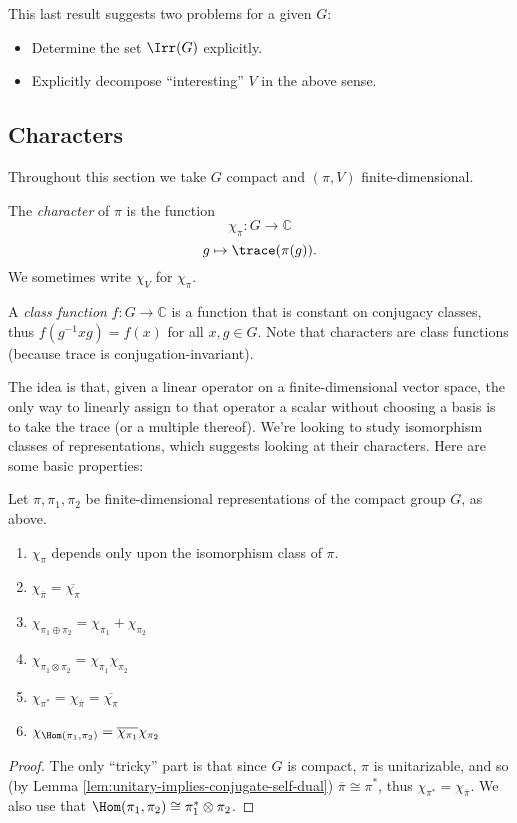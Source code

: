 \documentclass[reqno]{amsart} 
\begin{document}
This last result suggests two problems for a given $G$:
\begin{itemize}
\item Determine the set $\Irr(G)$ explicitly.
\item Explicitly decompose ``interesting'' $V$ in the above sense.
\end{itemize}

\subsection{Characters}\label{sec:cnh2vn9fzw}
Throughout this section we take $G$ compact and $(\pi,V)$ finite-dimensional.
\begin{definition}
  The \emph{character} of $\pi$ is the function
  \begin{equation*}
    \chi_\pi : G \rightarrow \mathbb{C}
  \end{equation*}
  \begin{equation*}
    g \mapsto \trace(\pi(g)).
  \end{equation*}
  We sometimes write $\chi_V$ for $\chi_\pi$.
  
  A \emph{class function} $f : G \rightarrow \mathbb{C}$ is a function that is constant on conjugacy classes, thus $f(g^{-1} x g) = f(x)$ for all $x,g \in G$.  Note that characters are class functions (because trace is conjugation-invariant).
\end{definition}
The idea is that, given a linear operator on a finite-dimensional vector space, the only way to linearly assign to that operator a scalar without choosing a basis is to take the trace (or a multiple thereof).  We're looking to study isomorphism classes of representations, which suggests looking at their characters.  Here are some basic properties:
\begin{lemma}\label{lem:characters-basic}
  Let $\pi, \pi_1, \pi_2$ be finite-dimensional representations of the compact group $G$, as above.
  \begin{enumerate}
  \item $\chi_{\pi}$ depends only upon the isomorphism class of $\pi$.
  \item $\chi_{\overline{\pi }} = \overline{\chi_\pi}$
  \item $\chi_{\pi_1 \oplus \pi_2}= \chi_{\pi_1} + \chi_{\pi_2}$
  \item $\chi_{\pi_1 \otimes \pi_2}= \chi_{\pi_1} \chi_{\pi_2}$
  \item $\chi_{\pi^*} = \chi_{\overline{\pi }} = \overline{\chi_\pi }$
  \item $\chi_{\Hom(\pi_1,\pi_2)} = \overline{\chi_{\pi_1}} \chi_{\pi_2}$
  \end{enumerate}
\end{lemma}
\begin{proof}
  The only ``tricky'' part is that since $G$ is compact, $\pi$ is unitarizable, and so (by Lemma \ref{lem:unitary-implies-conjugate-self-dual}) $\overline{\pi } \cong \pi^*$, thus $\chi_{\pi^*} = \chi_{\overline{\pi }}$.  We also use that $\Hom(\pi_1,\pi_2) \cong \pi_1^* \otimes \pi_2$.
\end{proof}
\end{document}
